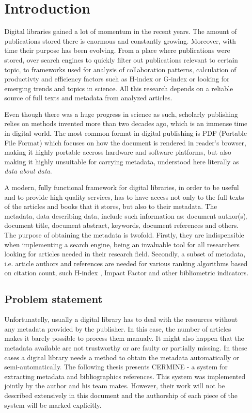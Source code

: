 \chapter{Introduction}
Digital libraries gained a lot of momentum in the recent years. The amount of publications stored there is enormous and constantly growing. Moreover, with time their purpose has been evolving. From a place where publications were stored, over search engines to quickly filter out publications relevant to certain topic, to frameworks used for analysis of collaboration patterns, calculation of productivty and efficiency factors such as H-index or G-index or looking for emerging trends and topics in science.
All this research depends on a reliable source of full texts and metadata from analyzed articles.

Even though there was a huge progress in science as such, scholarly publishing relies on methods invented more than two decades ago, which is an immense time in digital world. The most common format in digital publishing is PDF (Portable File Format) which focuses on how the document is rendered in reader's browser, making it highly portable accross hardware and software platforms, but also making it highly unsuitable for carrying metadata, understood here literally as \textit{data about data}.

A modern, fully functional framework for digital libraries, in order to be useful and to provide high quality services, has to have access not only to the full texts of the articles and books that it stores, but also to their metadata. The metadata, data describing data, include such information as: document author(s), document title, document abstract, keywords, document references and others. The purpose of obtaining the metadata is twofold. Firstly, they are indispensible when implementing a search engine, being an invaluable tool for all researchers looking for articles needed in their research field. Secondly, a subset of metadata, i.e. article authors and references are needed for various ranking algorithms based on citation count, such H-index \cite{Hirsch2005}, Impact Factor and other bibliometric indicators.
\section{Problem statement}
Unfortunatelly, usually a digital library has to deal with the resources without any metadata provided by the publisher. In this case, the number of articles makes it barely possible to process them manualy. It might also happen that the metadata available are not trustworthy or are faulty or partially missing. In these cases a digital library needs a method to obtain the metadata automatically or semi-automatically. The following thesis presents CERMINE - a system for extracting metadata and bibliographics references. This system was implemented jointly by the author and his team mates. However, their work will not be described extensively in this document and the authorship of each piece of the system will be marked explicitly. 
